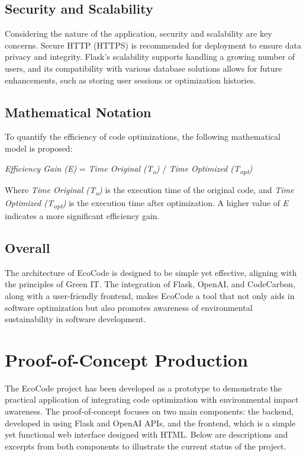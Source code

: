 \documentclass[conference,compsoc]{IEEEtran}
\begin{document}
\subsection{Security and Scalability}
Considering the nature of the application, security and scalability are key concerns. Secure HTTP (HTTPS) is recommended for deployment to ensure data privacy and integrity. Flask's scalability supports handling a growing number of users, and its compatibility with various database solutions allows for future enhancements, such as storing user sessions or optimization histories.

\subsection{Mathematical Notation}
To quantify the efficiency of code optimizations, the following mathematical model is proposed:

\textit{Efficiency Gain (E)} = \textit{Time Original (T\textsubscript{o})} / \textit{Time Optimized (T\textsubscript{opt})}

Where \textit{Time Original (T\textsubscript{o})} is the execution time of the original code, and \textit{Time Optimized (T\textsubscript{opt})} is the execution time after optimization. A higher value of \textit{E} indicates a more significant efficiency gain.

\subsection{Overall}
The architecture of EcoCode is designed to be simple yet effective, aligning with the principles of Green IT. The integration of Flask, OpenAI, and CodeCarbon, along with a user-friendly frontend, makes EcoCode a tool that not only aids in software optimization but also promotes awareness of environmental sustainability in software development.

\section{Proof-of-Concept Production}
The EcoCode project has been developed as a prototype to demonstrate the practical application of integrating code optimization with environmental impact awareness. The proof-of-concept focuses on two main components: the backend, developed in  using Flask and OpenAI APIs, and the frontend, which is a simple yet functional web interface designed with HTML. Below are descriptions and excerpts from both components to illustrate the current status of the project.
\end{document}
